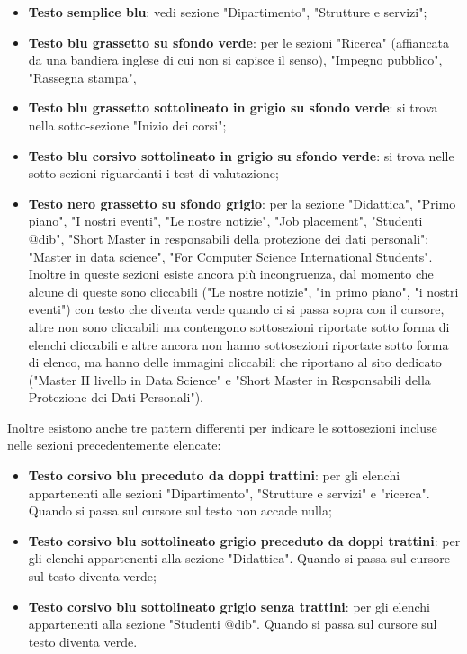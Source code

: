 	\begin{itemize}
		\item \textbf{Testo semplice blu}: vedi sezione "Dipartimento", "Strutture e servizi";
		
		\item \textbf{Testo blu grassetto su sfondo verde}: per le sezioni "Ricerca" (affiancata da una bandiera inglese di cui non si capisce 						  il senso), "Impegno pubblico", "Rassegna stampa", 
		\item \textbf{Testo blu grassetto sottolineato in grigio su sfondo verde}: si trova nella sotto-sezione "Inizio dei corsi";
		\item \textbf{Testo blu corsivo sottolineato in grigio su sfondo verde}: si trova nelle sotto-sezioni riguardanti i test di 								  valutazione;
		\item \textbf{Testo nero grassetto su sfondo grigio}: per la sezione "Didattica", "Primo piano", "I nostri eventi", "Le nostre 								  notizie", "Job placement", "Studenti @dib", "Short Master in responsabili della protezione dei dati personali"; "Master 						  in data science", "For Computer Science International Students". Inoltre in queste sezioni esiste ancora più incongruenza, dal momento che alcune di queste sono cliccabili ("Le nostre notizie", "in primo piano", "i nostri eventi") con testo che diventa verde quando ci si passa sopra con il cursore, altre non sono cliccabili ma contengono sottosezioni riportate sotto forma di elenchi cliccabili e altre ancora non hanno sottosezioni riportate sotto forma di elenco, ma hanno delle immagini cliccabili che riportano al sito dedicato ("Master II livello in Data Science" e "Short Master in Responsabili della Protezione dei Dati Personali").
	\end{itemize}
Inoltre esistono anche tre pattern differenti per indicare le sottosezioni incluse nelle sezioni precedentemente elencate:
	\begin{itemize}
		\item \textbf{Testo corsivo blu preceduto da doppi trattini}: per gli elenchi appartenenti alle sezioni "Dipartimento", "Strutture e servizi" e "ricerca". Quando si passa sul cursore sul testo non accade nulla;
		\item \textbf{Testo corsivo blu sottolineato grigio preceduto da doppi trattini}: per gli elenchi appartenenti alla sezione "Didattica". Quando si passa sul cursore sul testo diventa verde;
		\item \textbf{Testo corsivo blu sottolineato grigio senza trattini}: per gli elenchi appartenenti alla sezione "Studenti @dib". Quando si passa sul cursore sul testo diventa verde.
	\end{itemize}

